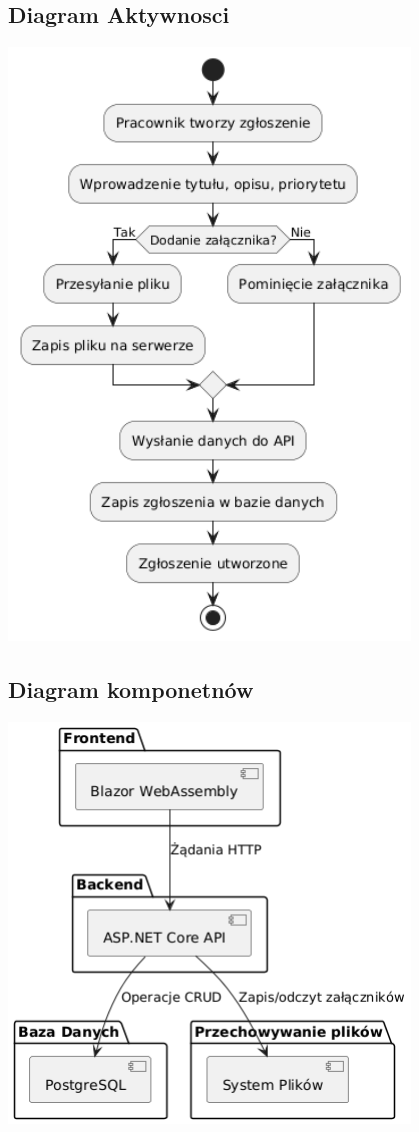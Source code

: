 \documentclass[a4paper,12pt]{article}
\begin{document}
\subsection{Diagram Aktywnosci}
\begin{center}
\includegraphics[width=0.8\textwidth]{draw/diagramAktywnosci.png}
\end{center}

\subsection{Diagram komponetnów}
\begin{center}
\includegraphics[width=0.8\textwidth]{draw/diagramKomponentow.png}
\end{center}
\end{document}
